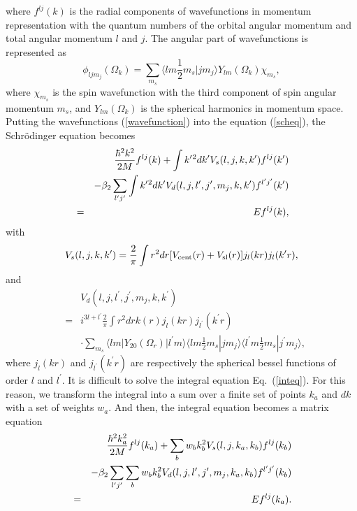\documentclass[twocolumn,prc,showpacs,preprintnumbers,superscriptaddress,floatfix]{revtex4}
\begin{document}
where $f^{lj}(k)$ is the radial components of wavefunctions in momentum
representation with the quantum numbers of the orbital angular momentum and
total angular momentum $l$ and $j$. The angular part of wavefunctions is
represented as
\begin{equation}
\phi _{ljm_{j}}(\Omega _{k})=\sum_{m_{s}}\langle lm\frac{1}{2}%
m_{s}|jm_{j}\rangle Y_{lm}(\Omega _{k})\chi _{m_{s}},  \label{spin}
\end{equation}%
where $\chi _{m_{s}}$ is the spin wavefunction with the third component of
spin angular momentum $m_{s}$, and $Y_{lm}(\Omega _{k})$ is the spherical
harmonics in momentum space. Putting the wavefunctions (\ref{wavefunction})
into the equation (\ref{scheq}), the Schr\"{o}dinger equation becomes
\begin{eqnarray}
&&\frac{\hbar ^{2}k^{2}}{2M}f^{lj}(k)+\int k^{\prime }{}^{2}dk^{\prime
}V_{s}(l,j,k,k^{\prime })f^{lj}(k^{\prime })  \notag \\
&&-\beta _{2}\sum_{l^{\prime }j^{\prime }}\int k^{\prime }{}^{2}dk^{\prime
}V_{d}(l,j,l^{\prime },j^{\prime },m_{j},k,k^{\prime })f^{l^{\prime
}j^{\prime }}(k^{\prime })  \notag \\
&=&Ef^{lj}(k),  \label{inteq}
\end{eqnarray}%
with%
\begin{equation*}
V_{s}(l,j,k,k^{\prime })=\frac{2}{\pi }\int r^{2}dr[V_{\text{cent}}(r)+V_{%
\text{sl}}(r)]j_{l}(kr)j_{l}(k^{\prime }r),
\end{equation*}%
and%
\begin{eqnarray*}
&&V_{d}(l,j,l^{\prime },j^{\prime },m_{j},k,k^{\prime }) \\
&=&i^{3l+l^{\prime }}\frac{2}{\pi }\int r^{2}drk\left( r\right)
j_{l}(kr)j_{l^{\prime }}(k^{\prime }r) \\
&&\cdot \sum_{m_{s}}\langle lm|Y_{20}(\Omega _{r})|l^{\prime }m\rangle
\langle lm\frac{1}{2}m_{s}|jm_{j}\rangle \langle l^{\prime }m\frac{1}{2}%
m_{s}|j^{\prime }m_{j}\rangle ,
\end{eqnarray*}%
where $j_{l}(kr)$ and $j_{l^{\prime }}(k^{\prime }r)$ are respectively the
spherical bessel functions of order $l$ and $l^{\prime }$. It is difficult
to solve the integral equation Eq.~(\ref{inteq}). For this reason, we
transform the integral into a sum over a finite set of points $k_{a}$ and $%
dk $ with a set of weights $w_{a}$. And then, the integral equation becomes
a matrix equation
\begin{eqnarray}
&&\frac{\hbar ^{2}k_{a}^{2}}{2M}f^{lj}(k_{a})+%
\sum_{b}w_{b}k_{b}^{2}V_{s}(l,j,k_{a},k_{b})f^{lj}(k_{b})  \notag \\
&&-\beta _{2}\sum_{l^{\prime }j^{\prime
}}\sum_{b}w_{b}k_{b}^{2}V_{d}(l,j,l^{\prime },j^{\prime
},m_{j},k_{a},k_{b})f^{l^{\prime }j^{\prime }}(k_{b})  \notag \\
&=&Ef^{lj}(k_{a}).  \label{sumeq}
\end{eqnarray}%
\end{document}
